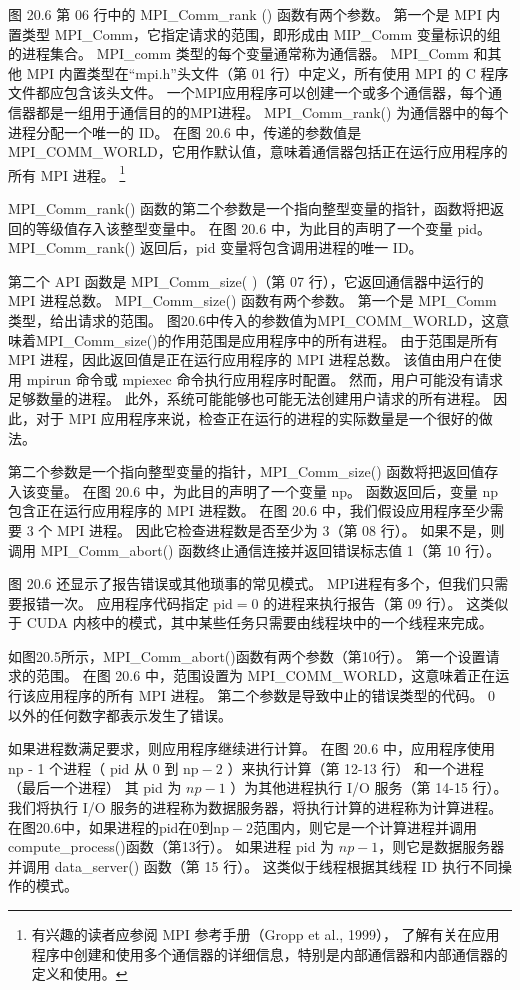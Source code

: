 图 20.6 第 06 行中的 MPI\_Comm\_rank () 函数有两个参数。
 第一个是 MPI 内置类型 MPI\_Comm，它指定请求的范围，即形成由 MIP\_Comm 变量标识的组的进程集合。 
 MPI\_comm 类型的每个变量通常称为通信器。 
 MPI\_Comm 和其他 MPI 内置类型在“mpi.h”头文件（第 01 行）中定义，所有使用 MPI 的 C 程序文件都应包含该头文件。 
 一个MPI应用程序可以创建一个或多个通信器，每个通信器都是一组用于通信目的的MPI进程。 
 MPI\_Comm\_rank() 为通信器中的每个进程分配一个唯一的 ID。 
 在图 20.6 中，传递的参数值是 MPI\_COMM\_WORLD，它用作默认值，意味着通信器包括正在运行应用程序的所有 MPI 进程。 
\footnote{有兴趣的读者应参阅 MPI 参考手册（Gropp et al., 1999），
了解有关在应用程序中创建和使用多个通信器的详细信息，特别是内部通信器和内部通信器的定义和使用。}

MPI\_Comm\_rank() 函数的第二个参数是一个指向整型变量的指针，函数将把返回的等级值存入该整型变量中。 
在图 20.6 中，为此目的声明了一个变量 pid。 MPI\_Comm\_rank() 返回后，pid 变量将包含调用进程的唯一 ID。

第二个 API 函数是 MPI\_Comm\_size( )（第 07 行），它返回通信器中运行的 MPI 进程总数。 
MPI\_Comm\_size() 函数有两个参数。 第一个是 MPI\_Comm 类型，给出请求的范围。 
图20.6中传入的参数值为MPI\_COMM\_WORLD，这意味着MPI\_Comm\_size()的作用范围是应用程序中的所有进程。 
由于范围是所有 MPI 进程，因此返回值是正在运行应用程序的 MPI 进程总数。 
该值由用户在使用 mpirun 命令或 mpiexec 命令执行应用程序时配置。 然而，用户可能没有请求足够数量的进程。 
此外，系统可能能够也可能无法创建用户请求的所有进程。 
因此，对于 MPI 应用程序来说，检查正在运行的进程的实际数量是一个很好的做法。

第二个参数是一个指向整型变量的指针，MPI\_Comm\_size() 函数将把返回值存入该变量。 
在图 20.6 中，为此目的声明了一个变量 np。 函数返回后，变量 np 包含正在运行应用程序的 MPI 进程数。 
在图 20.6 中，我们假设应用程序至少需要 3 个 MPI 进程。 因此它检查进程数是否至少为 3（第 08 行）。 
如果不是，则调用 MPI\_Comm\_abort() 函数终止通信连接并返回错误标志值 1（第 10 行）。

图 20.6 还显示了报告错误或其他琐事的常见模式。 MPI进程有多个，但我们只需要报错一次。 
应用程序代码指定 $\mathrm{pid}=0$ 的进程来执行报告（第 09 行）。 
这类似于 CUDA 内核中的模式，其中某些任务只需要由线程块中的一个线程来完成。

如图20.5所示，MPI\_Comm\_abort()函数有两个参数（第10行）。 第一个设置请求的范围。 
在图 20.6 中，范围设置为 MPI\_COMM\_WORLD，这意味着正在运行该应用程序的所有 MPI 进程。 
第二个参数是导致中止的错误类型的代码。 0 以外的任何数字都表示发生了错误。

如果进程数满足要求，则应用程序继续进行计算。 
在图 20.6 中，应用程序使用 np - 1 个进程（ $\mathrm{pid}$ 从 0 到 $\mathrm{np}-2$ ）来执行计算（第 12-13 行）
和一个进程（最后一个进程） 其 pid 为 $n p-1$ ）为其他进程执行 I/O 服务（第 14-15 行）。 
我们将执行 I/O 服务的进程称为数据服务器，将执行计算的进程称为计算进程。 
在图20.6中，如果进程的pid在0到$\mathrm{np}-2$范围内，则它是一个计算进程并调用compute\_process()函数（第13行）。 
如果进程 pid 为 $n p-1$，则它是数据服务器并调用 data\_server() 函数（第 15 行）。 
这类似于线程根据其线程 ID 执行不同操作的模式。

